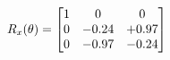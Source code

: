 \documentclass[preview]{standalone}
\begin{document}
\begin{align*}
\special{dvisvgm:raw <g id='unique000'>}R_{x}(\theta) = \begin{bmatrix}1 & 0 & 0 \\0 & -0.24 & +0.97 \\0 & -0.97 & -0.24\end{bmatrix}\special{dvisvgm:raw </g>}
\end{align*}
\end{document}
